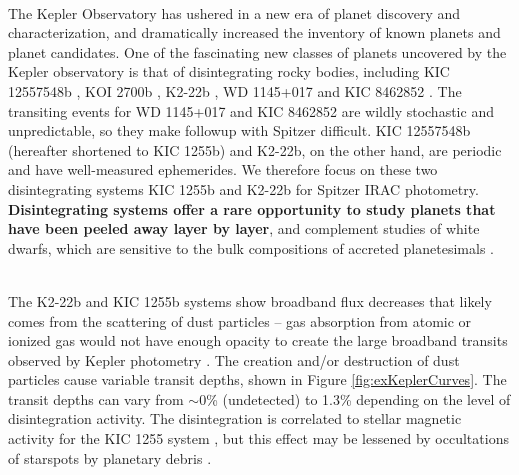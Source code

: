 \documentclass[letterpaper,12pt]{article}
\begin{document}
\\

The Kepler Observatory has ushered in a new era of planet discovery and characterization, and dramatically increased the inventory of known planets and planet candidates.
One of the fascinating new classes of planets uncovered by the Kepler observatory is that of disintegrating rocky bodies,
including KIC 12557548b \citep{rappaport}, KOI 2700b \citep{rappaport2014KOI2700}, K2-22b \citep{sanchis-ojedak2-22}, WD 1145+017 \citep{vanderburg2015wdDisintegrating} and KIC 8462852 \citep{boyajian846}.
The transiting events for WD 1145+017 and KIC 8462852 are wildly stochastic and unpredictable, so they make followup with Spitzer difficult.
KIC 12557548b (hereafter shortened to KIC 1255b) and K2-22b, on the other hand, are periodic and have well-measured ephemerides.
We therefore focus on these two disintegrating systems KIC 1255b  and K2-22b for Spitzer IRAC photometry.
\textbf{Disintegrating systems offer a rare opportunity to study planets that have been peeled away layer by layer}, and complement studies of white dwarfs, which are sensitive to the bulk compositions of accreted planetesimals \cite[e.g.][]{jura2003wdPollution}.\newline

\\

The K2-22b and KIC 1255b systems show broadband flux decreases that likely comes from the scattering of dust particles -- gas absorption from atomic or ionized gas would not have enough opacity to create the large broadband transits observed by Kepler photometry \citep[0.42 $\mu$m to 0.90 $\mu$m bandpass;][]{koch2010keplerChar}.
The creation and/or destruction of dust particles cause variable transit depths, shown in Figure \ref{fig:exKeplerCurves}.
The transit depths can vary from $\sim$0\% (undetected) to 1.3\% depending on the level of disintegration activity.
The disintegration is correlated to stellar magnetic activity for the KIC 1255 system \citep{kawahara2013starspots}, but this effect may be lessened by occultations of starspots by planetary debris \citep{croll2015starspots}.
\end{document}
